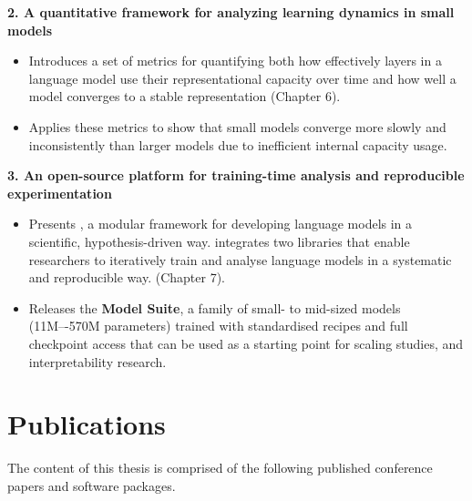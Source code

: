 \textbf{2. A quantitative framework for analyzing learning dynamics in small models}

\begin{itemize}
    \item Introduces a set of metrics for quantifying both how effectively layers in a language model use their representational capacity over time and how well a model converges to a stable representation (Chapter 6).

    \item Applies these metrics to show that small models converge more slowly and inconsistently than larger models due to inefficient internal capacity usage.

\end{itemize}

\textbf{3. An open-source platform for training-time analysis and reproducible experimentation}
\begin{itemize}
    \item Presents \textbf{\pico}, a modular framework for developing language models in a scientific, hypothesis-driven way. \pico integrates two libraries that enable researchers to iteratively train and analyse language models in a systematic and reproducible way. (Chapter 7).

    \item Releases the \textbf{\pico Model Suite}, a family of small- to mid-sized models (11M–-570M parameters) trained with standardised recipes and full checkpoint access that can be used as a starting point for scaling studies, and interpretability research.
\end{itemize}

\newpage
\section*{Publications}

The content of this thesis is comprised of the following published conference papers and software packages.

